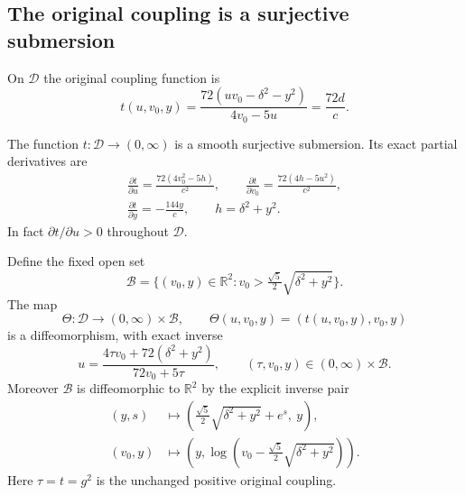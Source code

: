 \subsection{The original coupling is a surjective submersion}

On $\mathcal D$ the original coupling function is
\[
 t(u,v_0,y)=\frac{72(uv_0-\delta^2-y^2)}{4v_0-5u}
          =\frac{72d}{c}.
\]

\begin{theorem}
\label{sgd:smooth-addon:coupling}
The function $t:\mathcal D\to(0,\infty)$ is a smooth surjective
submersion. Its exact partial derivatives are
\begin{equation}
 \begin{gathered}
 \frac{\partial t}{\partial u}
 =\frac{72(4v_0^2-5h)}{c^2},\qquad
 \frac{\partial t}{\partial v_0}
 =\frac{72(4h-5u^2)}{c^2},\\
 \frac{\partial t}{\partial y}=-\frac{144y}{c},
 \qquad h=\delta^2+y^2.
 \end{gathered}
 \label{sgd:smooth-addon:derivatives}
\end{equation}
In fact $\partial t/\partial u>0$ throughout $\mathcal D$.

Define the fixed open set
\[
 \mathcal B=\{(v_0,y)\in\mathbb R^2:
        v_0>\tfrac{\sqrt5}{2}\sqrt{\delta^2+y^2}\}.
\]
The map
\begin{equation}
 \Theta:\mathcal D\longrightarrow(0,\infty)\times\mathcal B,
 \qquad \Theta(u,v_0,y)=(t(u,v_0,y),v_0,y)
 \label{sgd:smooth-addon:trivialization}
\end{equation}
is a diffeomorphism, with exact inverse
\begin{equation}
 u=\frac{4\tau v_0+72(\delta^2+y^2)}{72v_0+5\tau},
 \qquad (\tau,v_0,y)\in(0,\infty)\times\mathcal B.
 \label{sgd:smooth-addon:coupling-inverse}
\end{equation}
Moreover $\mathcal B$ is diffeomorphic to $\mathbb R^2$ by the
explicit inverse pair
\begin{equation}
 \begin{aligned}
 (y,s)&\longmapsto
 \left(\tfrac{\sqrt5}{2}\sqrt{\delta^2+y^2}+e^s,\ y\right),\\
 (v_0,y)&\longmapsto
 \left(y,\log\!\left(v_0-\tfrac{\sqrt5}{2}\sqrt{\delta^2+y^2}\right)\right).
 \end{aligned}
 \label{sgd:smooth-addon:B-chart}
\end{equation}
Here $\tau=t=g^2$ is the unchanged positive original coupling.
\end{theorem}

